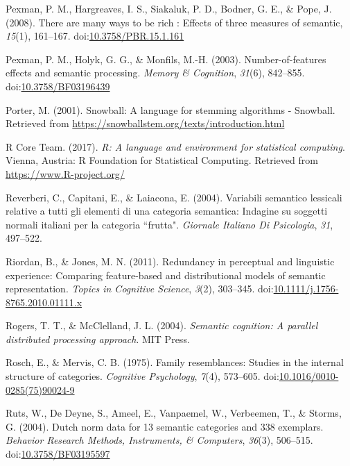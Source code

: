 \documentclass[english,,man]{apa6}
\theoremstyle{definition}
\theoremstyle{definition}
\theoremstyle{definition}
\theoremstyle{remark}
\begin{document}
\hypertarget{ref-Pexman2008}{}
Pexman, P. M., Hargreaves, I. S., Siakaluk, P. D., Bodner, G. E., \&
Pope, J. (2008). There are many ways to be rich : Effects of three
measures of semantic, \emph{15}(1), 161--167.
doi:\href{https://doi.org/10.3758/PBR.15.1.161}{10.3758/PBR.15.1.161}

\hypertarget{ref-Pexman2003}{}
Pexman, P. M., Holyk, G. G., \& Monfils, M.-H. (2003).
Number-of-features effects and semantic processing. \emph{Memory \&
Cognition}, \emph{31}(6), 842--855.
doi:\href{https://doi.org/10.3758/BF03196439}{10.3758/BF03196439}

\hypertarget{ref-Porter2001}{}
Porter, M. (2001). Snowball: A language for stemming algorithms -
Snowball. Retrieved from
\url{https://snowballstem.org/texts/introduction.html}

\hypertarget{ref-R-base}{}
R Core Team. (2017). \emph{R: A language and environment for statistical
computing}. Vienna, Austria: R Foundation for Statistical Computing.
Retrieved from \url{https://www.R-project.org/}

\hypertarget{ref-Reverberi2004}{}
Reverberi, C., Capitani, E., \& Laiacona, E. (2004). Variabili semantico
lessicali relative a tutti gli elementi di una categoria semantica:
Indagine su soggetti normali italiani per la categoria ``frutta".
\emph{Giornale Italiano Di Psicologia}, \emph{31}, 497--522.

\hypertarget{ref-Riordan2011}{}
Riordan, B., \& Jones, M. N. (2011). Redundancy in perceptual and
linguistic experience: Comparing feature-based and distributional models
of semantic representation. \emph{Topics in Cognitive Science},
\emph{3}(2), 303--345.
doi:\href{https://doi.org/10.1111/j.1756-8765.2010.01111.x}{10.1111/j.1756-8765.2010.01111.x}

\hypertarget{ref-Rogers2004}{}
Rogers, T. T., \& McClelland, J. L. (2004). \emph{Semantic cognition: A
parallel distributed processing approach}. MIT Press.

\hypertarget{ref-Rosch1975}{}
Rosch, E., \& Mervis, C. B. (1975). Family resemblances: Studies in the
internal structure of categories. \emph{Cognitive Psychology},
\emph{7}(4), 573--605.
doi:\href{https://doi.org/10.1016/0010-0285(75)90024-9}{10.1016/0010-0285(75)90024-9}

\hypertarget{ref-Ruts2004}{}
Ruts, W., De Deyne, S., Ameel, E., Vanpaemel, W., Verbeemen, T., \&
Storms, G. (2004). Dutch norm data for 13 semantic categories and 338
exemplars. \emph{Behavior Research Methods, Instruments, \& Computers},
\emph{36}(3), 506--515.
doi:\href{https://doi.org/10.3758/BF03195597}{10.3758/BF03195597}
\end{document}

